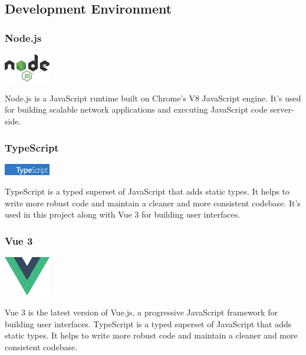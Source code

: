 \subsection{Development Environment}

\subsubsection{Node.js}

\begin{center}
\includegraphics[width=0.15\textwidth]{Images/logos/node.png}
\label{fig:nodejs}
\end{center}
Node.js is a JavaScript runtime built on Chrome’s V8 JavaScript engine. It’s used for building scalable network applications and executing JavaScript code server-side.



\subsubsection{TypeScript}

\begin{center}
\includegraphics[width=0.15\textwidth]{Images/logos/ts-lettermark-blue.png}
\label{fig:typescript}
\end{center}
TypeScript is a typed superset of JavaScript that adds static types. It helps to write more robust code and maintain a cleaner and more consistent codebase. It’s used in this project along with Vue 3 for building user interfaces.

\subsubsection{Vue 3}

\begin{center}
\includegraphics[width=0.15\textwidth]{Images/logos/vue.png}
\label{fig:vue3}
\end{center}
Vue 3 is the latest version of Vue.js, a progressive JavaScript framework for building user interfaces. TypeScript is a typed superset of JavaScript that adds static types. It helps to write more robust code and maintain a cleaner and more consistent codebase.

